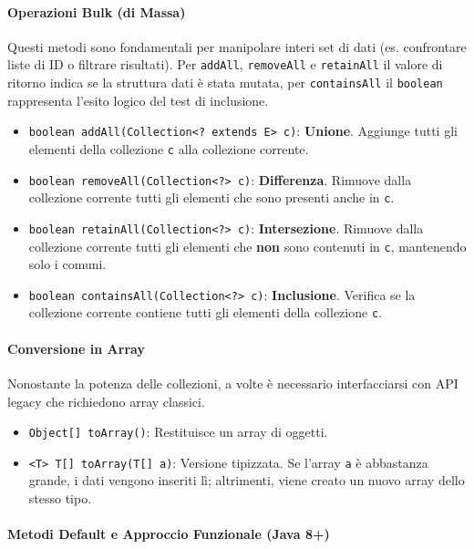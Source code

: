 \paragraph{Operazioni Bulk (di Massa)}

Questi metodi sono fondamentali per manipolare interi set di dati (es. confrontare liste di ID o filtrare risultati). Per \texttt{addAll}, \texttt{removeAll} e \texttt{retainAll} il valore di ritorno indica se la struttura dati è stata mutata, per \texttt{containsAll} il \texttt{boolean} rappresenta l'esito logico del test di inclusione.

\begin{itemize}
    \item \texttt{boolean addAll(Collection<? extends E> c)}: \textbf{Unione}. Aggiunge tutti gli elementi della collezione \texttt{c} alla collezione corrente. 
    \item \texttt{boolean removeAll(Collection<?> c)}: \textbf{Differenza}. Rimuove dalla collezione corrente tutti gli elementi che sono presenti anche in \texttt{c}. 
    \item \texttt{boolean retainAll(Collection<?> c)}: \textbf{Intersezione}. Rimuove dalla collezione corrente tutti gli elementi che \textbf{non} sono contenuti in \texttt{c}, mantenendo solo i comuni. 
    \item \texttt{boolean containsAll(Collection<?> c)}: \textbf{Inclusione}. Verifica se la collezione corrente contiene tutti gli elementi della collezione \texttt{c}. 
\end{itemize}

\paragraph{Conversione in Array}

Nonostante la potenza delle collezioni, a volte è necessario interfacciarsi con API legacy che richiedono array classici.
\begin{itemize}
    \item \texttt{Object[] toArray()}: Restituisce un array di oggetti.
    \item \texttt{<T> T[] toArray(T[] a)}: Versione tipizzata. Se l'array \texttt{a} è abbastanza grande, i dati vengono inseriti lì; altrimenti, viene creato un nuovo array dello stesso tipo.
\end{itemize}

\paragraph{Metodi Default e Approccio Funzionale (Java 8+)}

